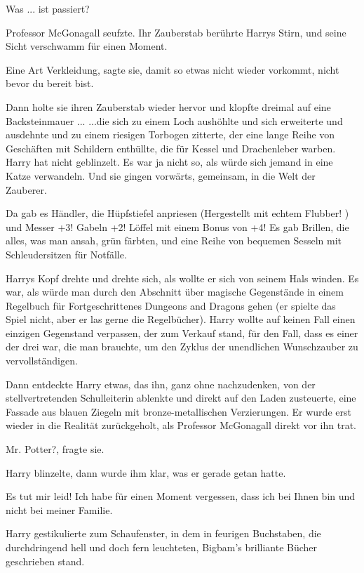 \glqq{}Was ... ist passiert?\grqq{}

Professor McGonagall seufzte. Ihr Zauberstab berührte Harrys Stirn, und seine
Sicht verschwamm für einen Moment.

\glqq{}Eine Art Verkleidung\grqq{}, sagte sie, \glqq{}damit so etwas nicht wieder
vorkommt, nicht bevor du bereit bist.\grqq{}

Dann holte sie ihren Zauberstab wieder hervor und klopfte dreimal auf eine
Backsteinmauer ... ...die sich zu einem Loch aushöhlte und sich erweiterte und
ausdehnte und zu einem riesigen Torbogen zitterte, der eine lange Reihe von
Geschäften mit Schildern enthüllte, die für Kessel und Drachenleber warben.
Harry hat nicht geblinzelt. Es war ja nicht so, als würde sich jemand in eine
Katze verwandeln. Und sie gingen vorwärts, gemeinsam, in die Welt der Zauberer.

Da gab es Händler, die Hüpfstiefel anpriesen (\glqq{}Hergestellt mit echtem
Flubber!\grqq{} ) und \glqq{}Messer +3! Gabeln +2! Löffel mit einem Bonus von
+4!\grqq{} Es gab Brillen, die alles, was man ansah, grün färbten, und eine
Reihe von bequemen Sesseln mit Schleudersitzen für Notfälle.

Harrys Kopf drehte und drehte sich, als wollte er sich von seinem Hals winden.
Es war, als würde man durch den Abschnitt über magische Gegenstände in einem
Regelbuch für Fortgeschrittenes Dungeons and Dragons gehen (er spielte das Spiel
nicht, aber er las gerne die Regelbücher). Harry wollte auf keinen Fall einen
einzigen Gegenstand verpassen, der zum Verkauf stand, für den Fall, dass es
einer der drei war, die man brauchte, um den Zyklus der unendlichen Wunschzauber
zu vervollständigen.

Dann entdeckte Harry etwas, das ihn, ganz ohne nachzudenken, von der
stellvertretenden Schulleiterin ablenkte und direkt auf den Laden zusteuerte,
eine Fassade aus blauen Ziegeln mit bronze-metallischen Verzierungen. Er wurde
erst wieder in die Realität zurückgeholt, als Professor McGonagall direkt vor
ihn trat.

\glqq{}Mr. Potter?\grqq{}, fragte sie.

Harry blinzelte, dann wurde ihm klar, was er gerade getan hatte.

\glqq{}Es tut mir leid! Ich habe für einen Moment vergessen, dass ich bei Ihnen
bin und nicht bei meiner Familie.\grqq{}

Harry gestikulierte zum Schaufenster, in dem in feurigen Buchstaben, die
durchdringend hell und doch fern leuchteten, \glqq{}Bigbam's brilliante
Bücher\grqq{} geschrieben stand.

